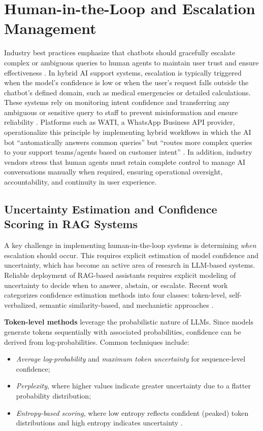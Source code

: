 \section{Human-in-the-Loop and Escalation Management}
Industry best practices emphasize that chatbots should gracefully escalate complex or ambiguous queries to human agents to maintain user trust and ensure effectiveness \cite{freshworks2024analytics}. In hybrid AI support systems, escalation is typically triggered when the model’s confidence is low or when the user’s request falls outside the chatbot’s defined domain, such as medical emergencies or detailed calculations. These systems rely on monitoring intent confidence and transferring any ambiguous or sensitive query to staff to prevent misinformation and ensure reliability \cite{freshworks2024analytics}. Platforms such as WATI, a WhatsApp Business API provider, operationalize this principle by implementing hybrid workflows in which the AI bot “automatically answers common queries” but “routes more complex queries to your support teams/agents based on customer intent” \cite{wati2024aisupport}. In addition, industry vendors stress that human agents must retain complete control to manage AI conversations manually when required, ensuring operational oversight, accountability, and continuity in user experience.

\subsection{Uncertainty Estimation and Confidence Scoring in RAG Systems}
A key challenge in implementing human-in-the-loop systems is determining \emph{when} escalation should occur. This requires explicit estimation of model confidence and uncertainty, which has become an active area of research in LLM-based systems. Reliable deployment of RAG-based assistants requires explicit modeling of uncertainty to decide when to answer, abstain, or escalate. Recent work categorizes confidence estimation methods into four classes: token-level, self-verbalized, semantic similarity-based, and mechanistic approaches \cite{acm2024uncertainty}.

\textbf{Token-level methods} leverage the probabilistic nature of LLMs. Since models generate tokens sequentially with associated probabilities, confidence can be derived from log-probabilities. Common techniques include:
\begin{itemize}\setlength{\itemsep}{0pt}
    \item \textit{Average log-probability} and \textit{maximum token uncertainty} for sequence-level confidence;
    \item \textit{Perplexity}, where higher values indicate greater uncertainty due to a flatter probability distribution;
    \item \textit{Entropy-based scoring}, where low entropy reflects confident (peaked) token distributions and high entropy indicates uncertainty \cite{acm2024uncertainty}.
\end{itemize}

